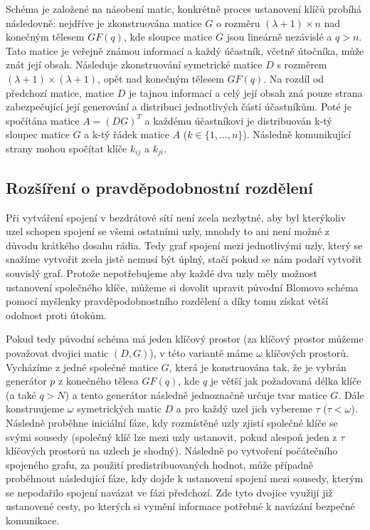 \documentclass[11pt,final,twoside]{fithesis2}
\begin{document}
Schéma je založené na násobení matic, konkrétně proces ustanovení klíčů probíhá následovně: 
nejdříve je zkonstruována matice $G$ o rozměru $(\lambda + 1) \times n$ nad konečným tělesem $GF(q)$, kde sloupce matice $G$ jsou lineárně nezávislé a $q > n$.
Tato matice je veřejně známou informací a každý účastník, včetně útočníka, může znát její obsah. Následuje zkonstruování symetrické matice $D$ s rozměrem $(\lambda + 1) \times (\lambda + 1) $, 
opět nad konečným tělesem $GF(q)$. Na rozdíl od předchozí matice, matice $D$ je tajnou informací a celý její obsah zná pouze strana zabezpečující její generování a distribuci jednotlivých částí 
účastníkům. Poté je spočítána matice $A= (DG)^T$ a každému účastníkovi je distribuován k-tý sloupec matice $G$ a k-tý řádek matice $A$ ($k \in \{1, \dots , n\}$). Následně komunikující strany
mohou spočítat klíče $k_{ij}$ a $k_{ji}$.  

\subsection{Rozšíření o pravděpodobnostní rozdělení}
Při vytváření spojení v bezdrátové sítí není zcela nezbytné, aby byl kterýkoliv uzel schopen spojení se všemi ostatními uzly, mnohdy to ani není možné z důvodu krátkého dosahu rádia. Tedy
graf spojení mezi jednotlivými uzly, který se snažíme vytvořit zcela jistě nemusí být úplný, stačí pokud se nám podaří vytvořit souvislý graf. Protože nepotřebujeme aby každé dva uzly 
měly možnost ustanovení společného klíče, můžeme si dovolit upravit původní Blomovo schéma pomocí myšlenky pravděpodobnostního rozdělení a díky tomu získat větší odolnost proti útokům. 

Pokud tedy původní schéma má jeden klíčový prostor (za klíčový prostor můžeme považovat dvojici matic $(D, G)$), v této variantě máme $\omega$ klíčových prostorů. Vycházíme z jedné společné matice $G$, 
která je konstruována tak, že je vybrán generátor $p$ z konečného tělesa $GF(q)$, kde $q$ je větší jak požadovaná délka klíče (a také $q > N$) a tento generátor následně jednoznačně určuje tvar matice $G$.
Dále konstruujeme $\omega$ symetrických matic $D$ a pro každý uzel jich vybereme $\tau$ ($\tau < \omega$). Následně proběhne iniciální fáze, kdy rozmístěné uzly zjistí společné klíče se svými sousedy
(společný klíč lze mezi uzly ustanovit, pokud alespoň jeden z $\tau$ klíčových prostorů na uzlech je shodný). Následně po vytvoření počátečního spojeného grafu, za použití predistribuovaných hodnot, 
může případně proběhnout následující fáze, kdy dojde k ustanovení spojení mezi sousedy, kterým se nepodařilo spojení navázat ve fázi předchozí. Zde tyto dvojice využijí již ustanovené cesty, po kterých si 
vymění informace potřebné k navázání bezpečné komunikace. 
\end{document}
